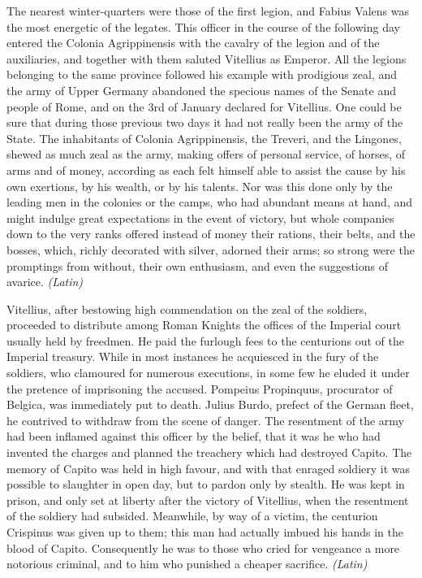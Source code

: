 
The nearest winter-quarters were those of the first legion, and Fabius Valens was the most energetic of the legates. This officer in the course of the following day entered the Colonia Agrippinensis with the cavalry of the legion and of the auxiliaries, and together with them saluted Vitellius as Emperor. All the legions belonging to the same province followed his example with prodigious zeal, and the army of Upper Germany abandoned the specious names of the Senate and people of Rome, and on the 3rd of January declared for Vitellius. One could be sure that during those previous two days it had not really been the army of the State. The inhabitants of Colonia Agrippinensis, the Treveri, and the Lingones, shewed as much zeal as the army, making offers of personal service, of horses, of arms and of money, according as each felt himself able to assist the cause by his own exertions, by his wealth, or by his talents. Nor was this done only by the leading men in the colonies or the camps, who had abundant means at hand, and might indulge great expectations in the event of victory, but whole companies down to the very ranks offered instead of money their rations, their belts, and the bosses, which, richly decorated with silver, adorned their arms; so strong were the promptings from without, their own enthusiasm, and even the suggestions of avarice. \emph{(Latin)}


Vitellius, after bestowing high commendation on the zeal of the soldiers, proceeded to distribute among Roman Knights the offices of the Imperial court usually held by freedmen. He paid the furlough fees to the centurions out of the Imperial treasury. While in most instances he acquiesced in the fury of the soldiers, who clamoured for numerous executions, in some few he eluded it under the pretence of imprisoning the accused. Pompeius Propinquus, procurator of Belgica, was immediately put to death. Julius Burdo, prefect of the German fleet, he contrived to withdraw from the scene of danger. The resentment of the army had been inflamed against this officer by the belief, that it was he who had invented the charges and planned the treachery which had destroyed Capito. The memory of Capito was held in high favour, and with that enraged soldiery it was possible to slaughter in open day, but to pardon only by stealth. He was kept in prison, and only set at liberty after the victory of Vitellius, when the resentment of the soldiery had subsided. Meanwhile, by way of a victim, the centurion Crispinus was given up to them; this man had actually imbued his hands in the blood of Capito. Consequently he was to those who cried for vengeance a more notorious criminal, and to him who punished a cheaper sacrifice. \emph{(Latin)}

